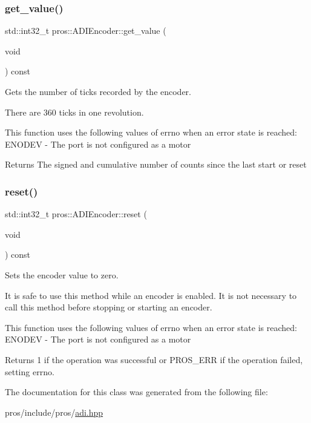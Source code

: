 \subsubsection{\texorpdfstring{get\+\_\+value()}{get\_value()}}
{\footnotesize\ttfamily std\+::int32\+\_\+t pros\+::\+A\+D\+I\+Encoder\+::get\+\_\+value (\begin{DoxyParamCaption}\item[{void}]{ }\end{DoxyParamCaption}) const}



Gets the number of ticks recorded by the encoder. 

There are 360 ticks in one revolution.

This function uses the following values of errno when an error state is reached\+: E\+N\+O\+D\+EV -\/ The port is not configured as a motor

\begin{DoxyReturn}{Returns}
The signed and cumulative number of counts since the last start or reset 
\end{DoxyReturn}
\mbox{\label{classpros_1_1ADIEncoder_a38a555946a841150b203f940b4b44cc8}} 
\subsubsection{\texorpdfstring{reset()}{reset()}}
{\footnotesize\ttfamily std\+::int32\+\_\+t pros\+::\+A\+D\+I\+Encoder\+::reset (\begin{DoxyParamCaption}\item[{void}]{ }\end{DoxyParamCaption}) const}



Sets the encoder value to zero. 

It is safe to use this method while an encoder is enabled. It is not necessary to call this method before stopping or starting an encoder.

This function uses the following values of errno when an error state is reached\+: E\+N\+O\+D\+EV -\/ The port is not configured as a motor

\begin{DoxyReturn}{Returns}
1 if the operation was successful or P\+R\+O\+S\+\_\+\+E\+RR if the operation failed, setting errno. 
\end{DoxyReturn}


The documentation for this class was generated from the following file\+:\begin{DoxyCompactItemize}
\item 
pros/include/pros/\hyperlink{adi_8hpp}{adi.\+hpp}\end{DoxyCompactItemize}
